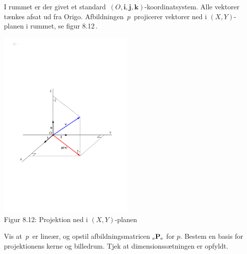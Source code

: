 \begin{exercise}\label{tn8.opgDimension2}
I rummet er der givet et standard $\,(O,\mathbf i,\mathbf j,\mathbf k)$-koordinatsystem. Alle vektorer tænkes afsat ud fra Origo. Afbildningen $\,p\,$ projicerer vektorer ned i $(X,Y)$-planen i rummet, se figur 8.12\,.

\begin{center}
		\includegraphics[trim=2cm 8cm 2cm
 8cm,width=0.50\textwidth,clip]{projektion.pdf}
  \\Figur 8.12: Projektion ned i  $(X,Y)$-planen
\end{center}

Vis at $\,p\,$ er lineær, og opstil afbildningsmatricen ${_\mathrm{e}\mathbf{P}_\mathrm{e}}$ for $p$. Bestem en basis for projektionens kerne og billedrum. Tjek at dimensionssætningen er opfyldt.

\end{exercise}



